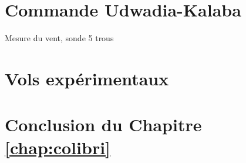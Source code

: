 {\color{blue}

}

\section{Commande Udwadia-Kalaba}

Mesure du vent, sonde 5 trous

\section{Vols expérimentaux}

\section{Conclusion du Chapitre \ref{chap:colibri}}






